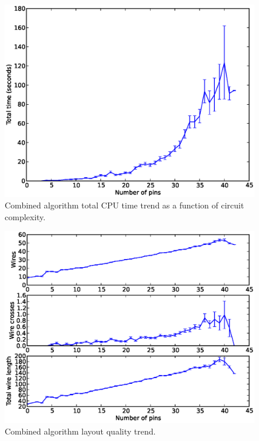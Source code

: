 \begin{figure}[H]
\begin{center}
\includegraphics[width=\textwidth]{Images/final_algorithm_time_trend.eps}
\caption[Combined algorithm time trend]{Combined algorithm total CPU time trend
as a function of circuit complexity.}
\label{fig:final_time_trend}
\end{center}
\end{figure}

\begin{figure}[H]
\begin{center}
\includegraphics[width=\textwidth]{Images/final_algorithm_quality_trend.eps}
\caption[Combined algorithm layout quality trend]{Combined algorithm layout
quality trend.}
\label{fig:final_quality_trend}
\end{center}
\end{figure}

